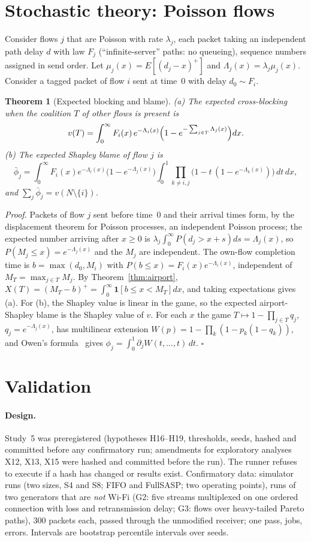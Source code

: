 \documentclass[11pt]{article}
\newtheorem{theorem}{Theorem}
\theoremstyle{definition}
\begin{document}
\section{Stochastic theory: Poisson flows}\label{sec:poisson}
Consider flows $j$ that are Poisson with rate $\lambda_j$, each packet taking an independent path delay $d$ with law $F_j$ (``infinite-server'' paths: no queueing), sequence numbers assigned in send order. Let $\mu_j(x)=E[(d_j-x)^+]$ and $\Lambda_j(x)=\lambda_j\mu_j(x)$. Consider a tagged packet of flow $i$ sent at time~$0$ with delay $d_0\sim F_i$.
\begin{theorem}[Expected blocking and blame]\label{thm:poisson}
(a) The expected cross-blocking when the coalition $T$ of other flows is present is
\[
v(T)=\int_0^\infty F_i(x)\,e^{-\Lambda_i(x)}\Bigl(1-e^{-\sum_{j\in T}\Lambda_j(x)}\Bigr)dx .
\]
(b) The expected Shapley blame of flow $j$ is
\[
\bar\phi_j=\int_0^\infty F_i(x)e^{-\Lambda_i(x)}\bigl(1-e^{-\Lambda_j(x)}\bigr)\int_0^1\prod_{k\ne i,j}\bigl(1-t\,(1-e^{-\Lambda_k(x)})\bigr)\,dt\,dx,
\]
and $\sum_j\bar\phi_j=v(N\setminus\{i\})$.
\end{theorem}
\emph{Proof.} Packets of flow $j$ sent before time~$0$ and their arrival times form, by the displacement theorem for Poisson processes, an independent Poisson process; the expected number arriving after $x\ge0$ is $\lambda_j\int_0^\infty P(d_j>x+s)ds=\Lambda_j(x)$, so $P(M_j\le x)=e^{-\Lambda_j(x)}$ and the $M_j$ are independent. The own-flow completion time is $b=\max(d_0,M_i)$ with $P(b\le x)=F_i(x)e^{-\Lambda_i(x)}$, independent of $M_T=\max_{j\in T}M_j$. By Theorem~\ref{thm:airport}, $X(T)=(M_T-b)^+=\int_0^\infty\mathbf 1[b\le x<M_T]dx$, and taking expectations gives (a). For (b), the Shapley value is linear in the game, so the expected airport-Shapley blame is the Shapley value of $v$. For each $x$ the game $T\mapsto1-\prod_{j\in T}q_j$, $q_j=e^{-\Lambda_j(x)}$, has multilinear extension $W(p)=1-\prod_k(1-p_k(1-q_k))$, and Owen's formula~\cite{owen1972multilinear} gives $\phi_j=\int_0^1\partial_jW(t,\dots,t)\,dt$. \hfill$\square$

\section{Validation}\label{sec:val}
\paragraph{Design.} Study~5 was preregistered (hypotheses H16--H19, thresholds, seeds, hashed and committed before any confirmatory run; amendments for exploratory analyses X12, X13, X15 were hashed and committed before the run). The runner refuses to execute if a hash has changed or results exist. Confirmatory data: \FvSimRuns{} simulator runs (two sizes, S4 and S8; FIFO and FullSASP; two operating points), \FvGenRuns{} runs of two generators that are \emph{not} Wi-Fi (G2: five streams multiplexed on one ordered connection with loss and retransmission delay; G3: flows over heavy-tailed Pareto paths), 300 packets each, passed through the unmodified receiver; one pass, \FvJobs{} jobs, \FvJobErr{} errors. Intervals are bootstrap percentile intervals over seeds.
\end{document}
